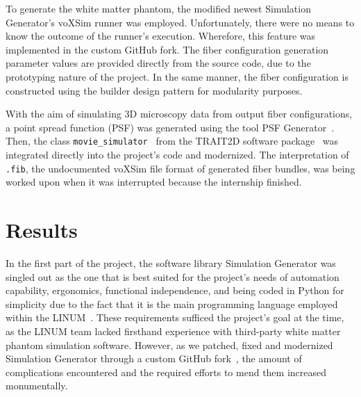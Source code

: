 \documentclass{article}
\begin{document}
  To generate the white matter phantom, the modified newest Simulation Generator's voXSim runner was employed.
  Unfortunately, there were no means to know the outcome of the runner's execution.
  Wherefore, this feature was implemented in the custom GitHub fork.
  The fiber configuration generation parameter values are provided directly from the source code, due to the prototyping nature of the project.
  In the same manner, the fiber configuration is constructed using the builder design pattern for modularity purposes.

  With the aim of simulating 3D microscopy data from output fiber configurations, a point spread function (PSF) was generated using the tool PSF Generator~\cite{kirshnersage2017psfgenerator}.
  Then, the class \lstinline!movie_simulator!~\cite{lefebvre2021trait2dmoviesim} from the TRAIT2D software package~\cite{reina2021trait2d} was integrated directly into the project's code and modernized.
  The interpretation of \lstinline!.fib!, the undocumented voXSim file format of generated fiber bundles, was being worked upon when it was interrupted because the internship finished.


  \section{Results}\label{sec:results}

  In the first part of the project, the software library Simulation Generator was singled out as the one that is best suited for the project's needs of automation capability, ergonomics, functional independence, and being coded in Python for simplicity due to the fact that it is the main programming language employed within the LINUM~\cite{dubreuil2022inf6200}.
  These requirements sufficed the project's goal at the time, as the LINUM team lacked firsthand experience with third-party white matter phantom simulation software.
  However, as we patched, fixed and modernized Simulation Generator through a custom GitHub fork~\cite{dubreuil2022inm5803simgenfork, valcourtcaron2022simulationgenerator}, the amount of complications encountered and the required efforts to mend them increased monumentally.
\end{document}
